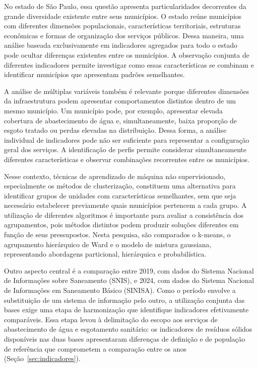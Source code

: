 \documentclass[12pt]{article}
\begin{document}
No estado de São Paulo, essa questão apresenta particularidades decorrentes da grande diversidade
existente entre seus municípios. O estado reúne municípios com diferentes dimensões populacionais,
características territoriais, estruturas econômicas e formas de organização dos serviços públicos.
Dessa maneira, uma análise baseada exclusivamente em indicadores agregados para todo o estado pode
ocultar diferenças existentes entre os municípios. A observação conjunta de diferentes indicadores
permite investigar como essas características se combinam e identificar municípios que apresentam
padrões semelhantes.

A análise de múltiplas variáveis também é relevante porque diferentes dimensões da infraestrutura
podem apresentar comportamentos distintos dentro de um mesmo município. Um município pode, por
exemplo, apresentar elevada cobertura de abastecimento de água e, simultaneamente, baixa proporção
de esgoto tratado ou perdas elevadas na distribuição. Dessa forma, a análise individual de
indicadores pode não ser suficiente para representar a configuração geral dos serviços. A
identificação de perfis permite considerar simultaneamente diferentes características e observar
combinações recorrentes entre os municípios.

Nesse contexto, técnicas de aprendizado de máquina não supervisionado, especialmente os métodos de
clusterização, constituem uma alternativa para identificar grupos de unidades com características
semelhantes, sem que seja necessário estabelecer previamente quais municípios pertencem a cada
grupo. A utilização de diferentes algoritmos é importante para avaliar a consistência dos
agrupamentos, pois métodos distintos podem produzir soluções diferentes em função de seus
pressupostos. Nesta pesquisa, são comparados o k-means, o agrupamento hierárquico de Ward e o modelo
de mistura gaussiana, representando abordagens particional, hierárquica e probabilística.

Outro aspecto central é a comparação entre 2019, com dados do Sistema Nacional de Informações sobre
Saneamento (SNIS), e 2024, com dados do Sistema Nacional de Informações em Saneamento Básico
(SINISA). Como o período envolve a substituição de um sistema de informação pelo outro, a utilização
conjunta das bases exige uma etapa de harmonização que identifique indicadores efetivamente
comparáveis. Essa etapa levou à delimitação do escopo aos serviços de abastecimento de água e
esgotamento sanitário: os indicadores de resíduos sólidos disponíveis nas duas bases apresentaram
diferenças de definição e de população de referência que comprometem a comparação entre os anos
(Seção~\ref{sec:indicadores}).
\end{document}
